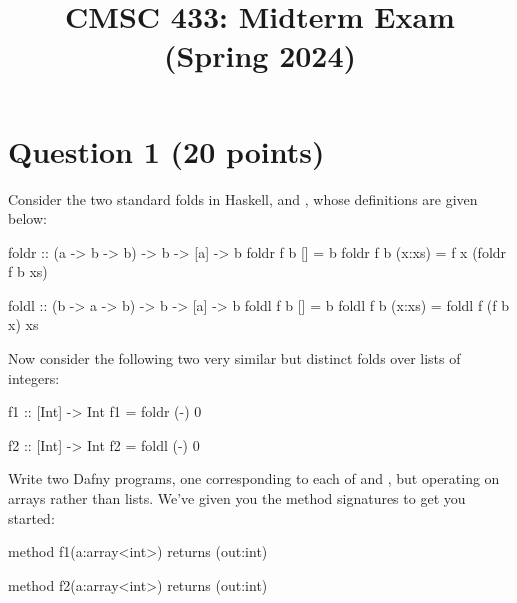 \documentclass{article}
\title{CMSC 433: Midterm Exam (Spring 2024)}
\author{}
\date{}
\begin{document}
\maketitle

\section*{Question 1 (20 points)}

Consider the two standard folds in Haskell,  and ,
whose definitions are given below:
\begin{hask}
  foldr :: (a -> b -> b) -> b -> [a] -> b
  foldr f b [] = b
  foldr f b (x:xs) = f x (foldr f b xs)
   
  foldl :: (b -> a -> b) -> b -> [a] -> b
  foldl f b [] = b
  foldl f b (x:xs) = foldl f (f b x) xs
\end{hask}

Now consider the following two very similar but distinct folds over
lists of integers:

\begin{hask}
  f1 :: [Int] -> Int
  f1 = foldr (-) 0

  f2 :: [Int] -> Int
  f2 = foldl (-) 0
\end{hask}

Write two Dafny programs, one corresponding to each of  and
, but operating on arrays rather than lists. We've given you
the method signatures to get you started:


\begin{minipage}{0.45\textwidth}
\begin{hask}
method f1(a:array<int>) returns (out:int) {                   


  



















}                                                             
\end{hask}
\end{minipage}
\hfill \vline \hfill
\begin{minipage}{0.45\textwidth}
\begin{hask}
method f2(a:array<int>) returns (out:int) {





















  
}                                                             
\end{hask}
\end{minipage}
\end{document}
